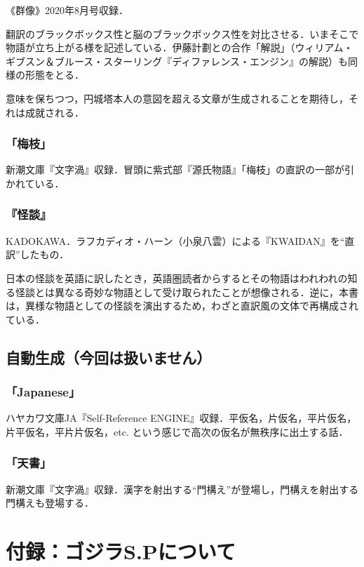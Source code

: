 \documentclass[10pt, a5paper, twoside]{jsarticle}
\theoremstyle{definition}
\begin{document}
				《群像》2020年8月号収録．

				翻訳のブラックボックス性と脳のブラックボックス性を対比させる．いまそこで物語が立ち上がる様を記述している．伊藤計劃との合作「解説」（ウィリアム・ギブスン＆ブルース・スターリング『ディファレンス・エンジン』の解説）も同様の形態をとる．

				意味を保ちつつ，円城塔本人の意図を超える文章が生成されることを期待し，それは成就される．

			\subsubsection{「梅枝」}

				新潮文庫『文字渦』収録．冒頭に紫式部『源氏物語』「梅枝」の直訳の一部が引かれている．

			\subsubsection{『怪談』}

				KADOKAWA．ラフカディオ・ハーン（小泉八雲）による『KWAIDAN』を“直訳”したもの．

				日本の怪談を英語に訳したとき，英語圏読者からするとその物語はわれわれの知る怪談とは異なる奇妙な物語として受け取られたことが想像される．逆に，本書は，異様な物語としての怪談を演出するため，わざと直訳風の文体で再構成されている．

		\subsection{自動生成（今回は扱いません）}

			\subsubsection{「Japanese」}

				ハヤカワ文庫JA『Self-Reference ENGINE』収録．平仮名，片仮名，平片仮名，片平仮名，平片片仮名，etc. という感じで高次の仮名が無秩序に出土する話．

			\subsubsection{「天書」}

				新潮文庫『文字渦』収録．漢字を射出する“門構え”が登場し，門構えを射出する門構えも登場する．

	\clearpage

	\section{付録：ゴジラS.Pについて}
\end{document}
